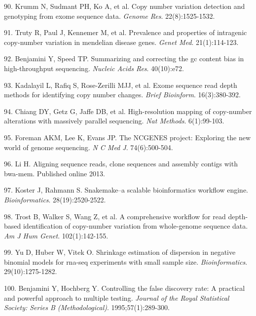 \documentclass[11pt,letterpaper]{book}
\begin{document}
\leavevmode\hypertarget{ref-krumm:2012aa}{}%
90. Krumm N, Sudmant PH, Ko A, et al. Copy number variation detection and genotyping from exome sequence data. \emph{Genome Res}. 22(8):1525-1532.

\leavevmode\hypertarget{ref-truty:2019aa}{}%
91. Truty R, Paul J, Kennemer M, et al. Prevalence and properties of intragenic copy-number variation in mendelian disease genes. \emph{Genet Med}. 21(1):114-123.

\leavevmode\hypertarget{ref-benjamini:2012aa}{}%
92. Benjamini Y, Speed TP. Summarizing and correcting the gc content bias in high-throughput sequencing. \emph{Nucleic Acids Res}. 40(10):e72.

\leavevmode\hypertarget{ref-kadalayil:2015aa}{}%
93. Kadalayil L, Rafiq S, Rose-Zerilli MJJ, et al. Exome sequence read depth methods for identifying copy number changes. \emph{Brief Bioinform}. 16(3):380-392.

\leavevmode\hypertarget{ref-chiang:2009aa}{}%
94. Chiang DY, Getz G, Jaffe DB, et al. High-resolution mapping of copy-number alterations with massively parallel sequencing. \emph{Nat Methods}. 6(1):99-103.

\leavevmode\hypertarget{ref-foreman:2013aa}{}%
95. Foreman AKM, Lee K, Evans JP. The NCGENES project: Exploring the new world of genome sequencing. \emph{N C Med J}. 74(6):500-504.

\leavevmode\hypertarget{ref-li:2013ab}{}%
96. Li H. Aligning sequence reads, clone sequences and assembly contigs with bwa-mem. Published online 2013.

\leavevmode\hypertarget{ref-koster:2012aa}{}%
97. Koster J, Rahmann S. Snakemake--a scalable bioinformatics workflow engine. \emph{Bioinformatics}. 28(19):2520-2522.

\leavevmode\hypertarget{ref-trost:2018aa}{}%
98. Trost B, Walker S, Wang Z, et al. A comprehensive workflow for read depth-based identification of copy-number variation from whole-genome sequence data. \emph{Am J Hum Genet}. 102(1):142-155.

\leavevmode\hypertarget{ref-yu:2013aa}{}%
99. Yu D, Huber W, Vitek O. Shrinkage estimation of dispersion in negative binomial models for rna-seq experiments with small sample size. \emph{Bioinformatics}. 29(10):1275-1282.

\leavevmode\hypertarget{ref-benjamini:1995aa}{}%
100. Benjamini Y, Hochberg Y. Controlling the false discovery rate: A practical and powerful approach to multiple testing. \emph{Journal of the Royal Statistical Society: Series B (Methodological)}. 1995;57(1):289-300.
\end{document}
